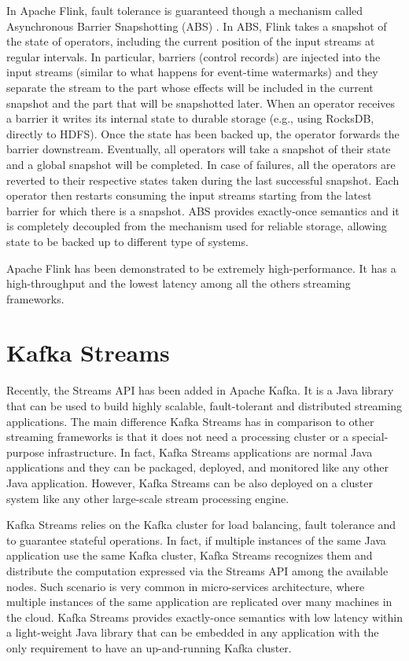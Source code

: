 In Apache Flink, fault tolerance is guaranteed though a mechanism called Asynchronous Barrier Snapshotting (ABS) \cite{apacheflinkstreamandbatch}. In ABS, Flink takes a snapshot of the state of operators, including the current position of the input streams at regular intervals. In particular, barriers (control records) are injected into the input streams (similar to what happens for event-time watermarks) and they separate the stream to the part whose effects will be included in the current snapshot and the part that will be snapshotted later. When an operator receives a barrier it writes its internal state to durable storage (e.g., using RocksDB, directly to HDFS). Once the state has been backed up, the operator forwards the barrier downstream. Eventually, all operators will take a snapshot of their state and a global snapshot will be completed. In case of failures, all the operators are reverted to their respective states taken during the last successful snapshot. Each operator then restarts consuming the input streams starting from the latest barrier for which there is a snapshot. ABS provides exactly-once semantics and it is completely decoupled from the mechanism used for reliable storage, allowing state to be backed up to different type of systems.

Apache Flink has been demonstrated \cite{yahoobenchmarkingonline, zalandobenchmarkingonline} to be extremely high-performance. It has a high-throughput and the lowest latency among all the others streaming frameworks.
\section{Kafka Streams}
Recently, the Streams API \cite{kafkastreamsonline} has been added in Apache Kafka. It is a Java library that can be used to build highly scalable, fault-tolerant and distributed streaming applications. The main difference Kafka Streams has in comparison to other streaming frameworks is that it does not need a processing cluster or a special-purpose infrastructure. In fact, Kafka Streams applications are normal Java applications and they can be packaged, deployed, and monitored like any other Java application. However, Kafka Streams can be also deployed on a cluster system like any other large-scale stream processing engine.

Kafka Streams relies on the Kafka cluster for load balancing, fault tolerance and to guarantee stateful operations. In fact, if multiple instances of the same Java application use the same Kafka cluster, Kafka Streams recognizes them and distribute the computation expressed via the Streams API among the available nodes. Such scenario is very common in micro-services architecture, where multiple instances of the same application are replicated over many machines in the cloud. Kafka Streams provides exactly-once semantics with low latency within a light-weight Java library that can be embedded in any application with the only requirement to have an up-and-running Kafka cluster.


